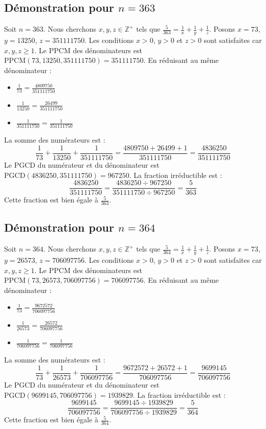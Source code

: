 \documentclass[11pt,a4paper]{article}
\begin{document}
\subsection{Démonstration pour $n = 363$}
Soit $n = 363$. Nous cherchons $x, y, z \in \mathbb{Z}^{+}$ tels que $\frac{5}{363} = \frac{1}{x} + \frac{1}{y} + \frac{1}{z}$.
Posons $x = 73$, $y = 13250$, $z = 351111750$.
Les conditions $x > 0$, $y > 0$ et $z > 0$ sont satisfaites car $x, y, z \geq 1$.
Le PPCM des dénominateurs est $\text{PPCM}(73, 13250, 351111750) = 351111750$.
En réduisant au même dénominateur :
\begin{itemize}
    \item $\frac{1}{73} = \frac{4809750}{351111750}$
    \item $\frac{1}{13250} = \frac{26499}{351111750}$
    \item $\frac{1}{351111750} = \frac{1}{351111750}$
\end{itemize}
La somme des numérateurs est :
$$ \frac{1}{73} + \frac{1}{13250} + \frac{1}{351111750} = \frac{4809750 + 26499 + 1}{351111750} = \frac{4836250}{351111750} $$
Le PGCD du numérateur et du dénominateur est $\text{PGCD}(4836250, 351111750) = 967250$.
La fraction irréductible est :
$$ \frac{4836250}{351111750} = \frac{4836250 \div 967250}{351111750 \div 967250} = \frac{5}{363} $$
Cette fraction est bien égale à $\frac{5}{363}$.

\subsection{Démonstration pour $n = 364$}
Soit $n = 364$. Nous cherchons $x, y, z \in \mathbb{Z}^{+}$ tels que $\frac{5}{364} = \frac{1}{x} + \frac{1}{y} + \frac{1}{z}$.
Posons $x = 73$, $y = 26573$, $z = 706097756$.
Les conditions $x > 0$, $y > 0$ et $z > 0$ sont satisfaites car $x, y, z \geq 1$.
Le PPCM des dénominateurs est $\text{PPCM}(73, 26573, 706097756) = 706097756$.
En réduisant au même dénominateur :
\begin{itemize}
    \item $\frac{1}{73} = \frac{9672572}{706097756}$
    \item $\frac{1}{26573} = \frac{26572}{706097756}$
    \item $\frac{1}{706097756} = \frac{1}{706097756}$
\end{itemize}
La somme des numérateurs est :
$$ \frac{1}{73} + \frac{1}{26573} + \frac{1}{706097756} = \frac{9672572 + 26572 + 1}{706097756} = \frac{9699145}{706097756} $$
Le PGCD du numérateur et du dénominateur est $\text{PGCD}(9699145, 706097756) = 1939829$.
La fraction irréductible est :
$$ \frac{9699145}{706097756} = \frac{9699145 \div 1939829}{706097756 \div 1939829} = \frac{5}{364} $$
Cette fraction est bien égale à $\frac{5}{364}$.
\end{document}
